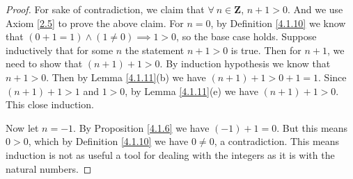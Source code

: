 \begin{proof}
    For sake of contradiction, we claim that \(\forall\ n \in \mathbf{Z}\), \(n + 1 > 0\).
    And we use Axiom \ref{2.5} to prove the above claim.
    For \(n = 0\), by Definition \ref{4.1.10} we know that \((0 + 1 = 1) \land (1 \neq 0) \implies 1 > 0\), so the base case holds.
    Suppose inductively that for some \(n\) the statement \(n + 1 > 0\) is true.
    Then for \(n + 1\), we need to show that \((n + 1) + 1 > 0\).
    By induction hypothesis we know that \(n + 1 > 0\).
    Then by Lemma \ref{4.1.11}(b) we have \((n + 1) + 1 > 0 + 1 = 1\).
    Since \((n + 1) + 1 > 1\) and \(1 > 0\), by Lemma \ref{4.1.11}(e) we have \((n + 1) + 1 > 0\).
    This close induction.

    Now let \(n = -1\).
    By Proposition \ref{4.1.6} we have \((-1) + 1 = 0\).
    But this means \(0 > 0\), which by Definition \ref{4.1.10} we have \(0 \neq 0\), a contradiction.
    This means induction is not as useful a tool for dealing with the integers as it is with the natural numbers.
\end{proof}